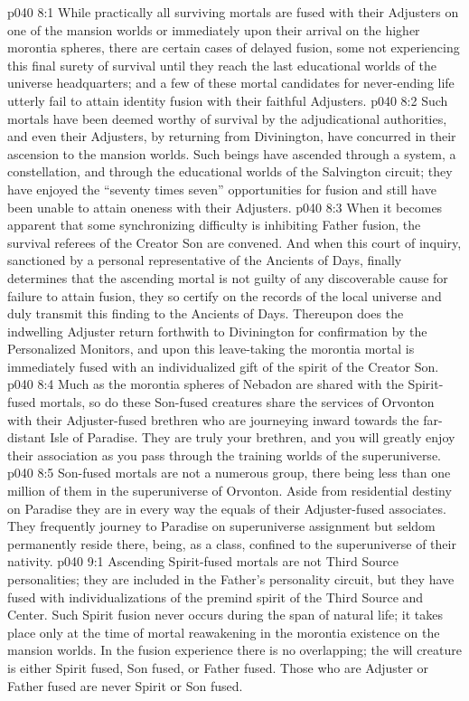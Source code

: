 \vs p040 8:1 While practically all surviving mortals are fused with their Adjusters on one of the mansion worlds or immediately upon their arrival on the higher morontia spheres, there are certain cases of delayed fusion, some not experiencing this final surety of survival until they reach the last educational worlds of the universe headquarters; and a few of these mortal candidates for never\hyp{}ending life utterly fail to attain identity fusion with their faithful Adjusters.
\vs p040 8:2 Such mortals have been deemed worthy of survival by the adjudicational authorities, and even their Adjusters, by returning from Divinington, have concurred in their ascension to the mansion worlds. Such beings have ascended through a system, a constellation, and through the educational worlds of the Salvington circuit; they have enjoyed the “seventy times seven” opportunities for fusion and still have been unable to attain oneness with their Adjusters.
\vs p040 8:3 When it becomes apparent that some synchronizing difficulty is inhibiting Father fusion, the survival referees of the Creator Son are convened. And when this court of inquiry, sanctioned by a personal representative of the Ancients of Days, finally determines that the ascending mortal is not guilty of any discoverable cause for failure to attain fusion, they so certify on the records of the local universe and duly transmit this finding to the Ancients of Days. Thereupon does the indwelling Adjuster return forthwith to Divinington for confirmation by the Personalized Monitors, and upon this leave\hyp{}taking the morontia mortal is immediately fused with an individualized gift of the spirit of the Creator Son.
\vs p040 8:4 \pc Much as the morontia spheres of Nebadon are shared with the Spirit\hyp{}fused mortals, so do these Son\hyp{}fused creatures share the services of Orvonton with their Adjuster\hyp{}fused brethren who are journeying inward towards the far\hyp{}distant Isle of Paradise. They are truly your brethren, and you will greatly enjoy their association as you pass through the training worlds of the superuniverse.
\vs p040 8:5 Son\hyp{}fused mortals are not a numerous group, there being less than one million of them in the superuniverse of Orvonton. Aside from residential destiny on Paradise they are in every way the equals of their Adjuster\hyp{}fused associates. They frequently journey to Paradise on superuniverse assignment but seldom permanently reside there, being, as a class, confined to the superuniverse of their nativity.
\vs p040 9:1 Ascending Spirit\hyp{}fused mortals are not Third Source personalities; they are included in the Father’s personality circuit, but they have fused with individualizations of the premind spirit of the Third Source and Center. Such Spirit fusion never occurs during the span of natural life; it takes place only at the time of mortal reawakening in the morontia existence on the mansion worlds. In the fusion experience there is no overlapping; the will creature is either Spirit fused, Son fused, or Father fused. Those who are Adjuster or Father fused are never Spirit or Son fused.
